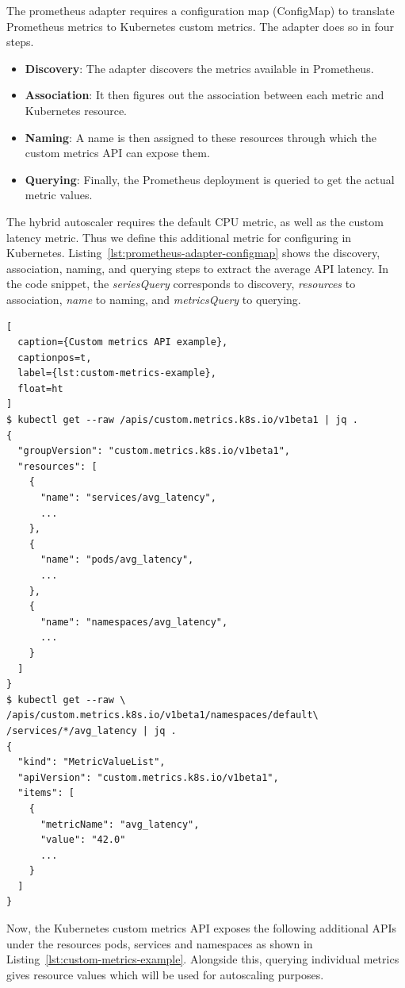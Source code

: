 The prometheus adapter requires a configuration map (ConfigMap) to translate Prometheus metrics to Kubernetes custom metrics. The adapter does so in four steps.

\begin{itemize}
    \item \textbf{Discovery}: The adapter discovers the metrics available in Prometheus.
    \item \textbf{Association}: It then figures out the association between each metric and Kubernetes resource.
    \item \textbf{Naming}: A name is then assigned to these resources through which the custom metrics API can expose them.
    \item \textbf{Querying}: Finally, the Prometheus deployment is queried to get the actual metric values.
\end{itemize}

The hybrid autoscaler requires the default CPU metric, as well as the custom latency metric. Thus we define this additional metric for configuring in Kubernetes. Listing~\ref{lst:prometheus-adapter-configmap} shows the discovery, association, naming, and querying steps to extract the average API latency. In the code snippet, the \textit{seriesQuery} corresponds to discovery, \textit{resources} to association, \textit{name} to naming, and \textit{metricsQuery} to querying.

\begin{lstlisting}[
  caption={Custom metrics API example},
  captionpos=t,
  label={lst:custom-metrics-example},
  float=ht
]
$ kubectl get --raw /apis/custom.metrics.k8s.io/v1beta1 | jq .
{
  "groupVersion": "custom.metrics.k8s.io/v1beta1",
  "resources": [
    {
      "name": "services/avg_latency",
      ...
    },
    {
      "name": "pods/avg_latency",
      ...
    },
    {
      "name": "namespaces/avg_latency",
      ...
    }
  ]
}
$ kubectl get --raw \
/apis/custom.metrics.k8s.io/v1beta1/namespaces/default\
/services/*/avg_latency | jq .
{
  "kind": "MetricValueList",
  "apiVersion": "custom.metrics.k8s.io/v1beta1",
  "items": [
    {
      "metricName": "avg_latency",
      "value": "42.0"
      ...
    }
  ]
}
\end{lstlisting}

Now, the Kubernetes custom metrics API exposes the following additional APIs under the resources pods, services and namespaces as shown in Listing~\ref{lst:custom-metrics-example}. Alongside this, querying individual metrics gives resource values which will be used for autoscaling purposes.

